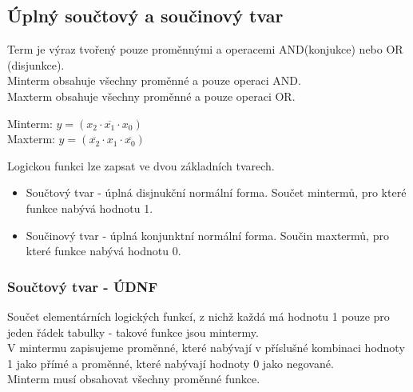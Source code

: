 \subsection*{Úplný součtový a součinový tvar}
Term je výraz tvořený pouze proměnnými a operacemi AND(konjukce) nebo OR (disjunkce).\\
Minterm obsahuje všechny proměnné a pouze operaci AND.\\
Maxterm obsahuje všechny proměnné a pouze operaci OR.
\begin{center}
    Minterm: \(y = (x_2 \cdot \overline{x_1} \cdot x_0)\)\\
    Maxterm: \(y = (\overline{x_2} \cdot x_1 \cdot \overline{x_0})\)
\end{center}

Logickou funkci lze zapsat ve dvou základních tvarech.\\
\begin{itemize}
    \item Součtový tvar - úplná disjnukční normální forma. Součet mintermů, pro které funkce nabývá hodnotu 1.
    \item Součinový tvar - úplná konjunktní normální forma. Součin maxtermů, pro které funkce nabývá hodnotu 0.
\end{itemize}

\subsubsection*{Součtový tvar - ÚDNF}
Součet elementárních logických funkcí, z nichž každá má hodnotu 1 pouze pro jeden řádek tabulky - takové funkce jsou mintermy.\\
V mintermu zapisujeme proměnné, které nabývají v příslušné kombinaci hodnoty 1 jako přímé a proměnné, které nabývají hodnoty 0 jako negované.\\
Minterm musí obsahovat všechny proměnné funkce.\\

